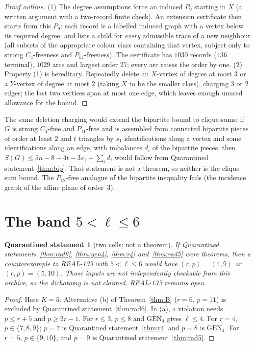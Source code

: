 \documentclass[11pt]{amsart}
\newtheorem{qrecord}[theorem]{Quarantined statement}
\theoremstyle{definition}
\theoremstyle{remark}
\newcommand{\lr}{\ell}
\newcommand{\pp}{p}
\newcommand{\GEN}{\mathrm{GEN}}
\begin{document}
\begin{proof}[Proof outline]
(1) The degree assumptions force an induced $P_9$ starting in $X$ (a written argument with a two-record finite check). An extension certificate then starts from this $P_9$: each record is a labelled induced graph with a vertex below its required degree, and lists a child for \emph{every} admissible trace of a new neighbour (all subsets of the appropriate colour class containing that vertex, subject only to strong $C_4$-freeness and $P_{11}$-freeness). The certificate has $1030$ records ($436$ terminal), $1029$ arcs and largest order $27$; every arc raises the order by one. (2) Property (1) is hereditary. Repeatedly delete an $X$-vertex of degree at most $3$ or a $Y$-vertex of degree at most $2$ (taking $X$ to be the smaller class), charging $3$ or $2$ edges; the last two vertices span at most one edge, which leaves enough unused allowance for the bound.
\end{proof}

The same deletion charging would extend the bipartite bound to clique-sums: if $G$ is strong $C_4$-free and $P_{11}$-free and is assembled from connected bipartite pieces of order at least $2$ and $t$ triangles by $s_1$ identifications along a vertex and some identifications along an edge, with imbalances $d_i$ of the bipartite pieces, then $S(G)\le5n-8-4t-3s_1-\sum_id_i$ would follow from Quarantined statement~\ref{thm:bip}. That statement is not a theorem, so neither is the clique-sum bound. The $P_{12}$-free analogue of the bipartite inequality fails (the incidence graph of the affine plane of order~$3$).

\section{The band \texorpdfstring{$5<\lr\le6$}{5<l<=6}}\label{sec:cells}

\begin{qrecord}[two cells; not a theorem]\label{prop:cells}
If Quarantined statements~\ref{thm:rad6}, \ref{thm:gen4}, \ref{thm:r4} and~\ref{thm:rad5} were theorems, then a counterexample to REAL-133 with $5<\lr\le6$ would have $(r,\pp)=(4,9)$ or $(r,\pp)=(5,10)$. Those inputs are not independently checkable from this archive, so the dichotomy is not claimed. REAL-133 remains open.
\end{qrecord}

\begin{proof}
Here $K=5$. Alternative (b) of Theorem~\ref{thm:B} ($r=6$, $\pp=11$) is excluded by Quarantined statement~\ref{thm:rad6}. In (a), a violation needs $\pp\le r+5$ and $\pp\ge2r-1$. For $r\le3$, $\pp\le8$ and $\GEN_4$ gives $\lr\le4$. For $r=4$, $\pp\in\{7,8,9\}$; $\pp=7$ is Quarantined statement~\ref{thm:r4} and $\pp=8$ is $\GEN_4$. For $r=5$, $\pp\in\{9,10\}$, and $\pp=9$ is Quarantined statement~\ref{thm:rad5}.
\end{proof}
\end{document}
